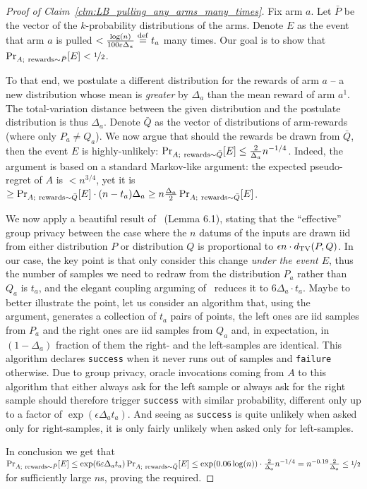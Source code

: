 \documentclass{article}
\begin{document}
\begin{proof}[Proof of Claim~\ref{clm:LB_pulling_any_arms_many_times}]
Fix arm $a$. Let $\bar P$ be the vector of the $k$-probability distributions of the arms. Denote $E$ as the event that arm $a$ is pulled $<\tfrac{\log(n)}{100\varepsilon\Delta_a} \stackrel{\rm def}= t_a$ many times. Our goal is to show that $\Pr_{A;~{\rm rewards}\sim \bar P}[E]<\nicefrac 1 2$.

To that end, we postulate a different distribution for the rewards of arm $a$ -- a new distribution whose mean is \emph{greater} by $\Delta_a$ than the mean reward of arm $a^1$. The total-variation distance between the given distribution and the postulate distribution is thus $\Delta_a$. Denote $\bar Q$ as the vector of distributions of arm-rewards (where only $P_a \neq Q_a$). We now argue that should the rewards be drawn from $\bar Q$, then the event $E$ is highly-unlikely: $\Pr_{A;~{\rm rewards}\sim \bar Q}[E] \leq \tfrac 2{\Delta_a}n^{-1/4}$. Indeed, the argument is based on a standard Markov-like argument: the expected pseudo-regret of $A$ is $<n^{3/4}$, yet it is $\geq \Pr_{A;~{\rm rewards}\sim \bar Q}[E]\cdot (n-t_a) \Delta_a \geq n\tfrac{\Delta_a}2\Pr_{A;~{\rm rewards}\sim \bar Q}[E]$.


We now apply a beautiful result of~\cite{KarwaVadhanFiniteSampleDP2017} (Lemma 6.1), stating that the ``effective'' group privacy between the case where the $n$ datums of the inputs are drawn iid from either distribution $P$ or distribution $Q$ is proportional to $\epsilon n\cdot d_{\rm TV}(P,Q)$. In our case, the key point is that only consider this change \emph{under the event $E$}, thus the number of samples we need to redraw from the distribution $P_a$ rather than $Q_a$ is $t_a$, and the elegant coupling arguming of~\cite{KarwaVadhanFiniteSampleDP2017} reduces it to $6\Delta_a \cdot t_a$. Maybe to better illustrate the point, let us consider an algorithm that, using the~\cite{KarwaVadhanFiniteSampleDP2017} argument, generates a collection of $t_a$ pairs of points, the left ones are iid samples from $P_a$ and the right ones are iid samples from $Q_a$ and, in expectation, in $(1-\Delta_a)$ fraction of them the right- and the left-samples are identical. This algorithm declares {\tt success} when it never runs out of samples and {\tt failure} otherwise. Due to group privacy, oracle invocations coming from $A$ to this algorithm that either always ask for the left sample or always ask for the right sample should therefore trigger {\tt success} with similar probability, different only up to a factor of $\exp(\epsilon \Delta_a t_a)$. And seeing as {\tt success} is quite unlikely when asked only for right-samples, it is only fairly unlikely when asked only for left-samples.

In conclusion we get that $\Pr_{A;~{\rm rewards}\sim \bar P}[E] \leq \exp(6\varepsilon\Delta_a t_a)\Pr_{A;~{\rm rewards}\sim \bar Q}[E] \leq \exp(0.06 \log(n)) \cdot \tfrac 2{\Delta_a}n^{-1/4} = n^{-0.19}\tfrac 2{\Delta_a} \leq \nicefrac 1 2$ for sufficiently large $n$s, proving the required.
\end{proof}


\end{document}

